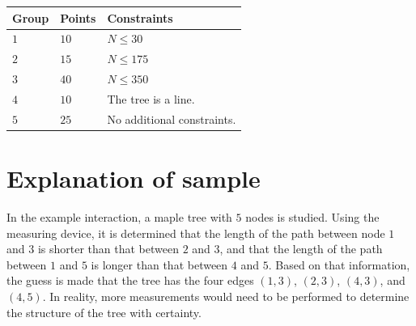 \noindent
\begin{tabular}{| l | l | p{12cm} |}
  \hline
  \textbf{Group} & \textbf{Points} & \textbf{Constraints} \\ \hline
  $1$   & $10$       & $N \le 30$\\ \hline
  $2$   & $15$       & $N \le 175$  \\ \hline
  $3$   & $40$       & $N \le 350$ \\ \hline
  $4$   & $10$       & The tree is a line. \\ \hline
  $5$   & $25$       & No additional constraints. \\ \hline
\end{tabular}


\section*{Explanation of sample}
In the example interaction, a maple tree with $5$ nodes is studied.
Using the measuring device, it is determined that the length of the path between node $1$ and $3$ is shorter
than that between $2$ and $3$, and that the length of the path between $1$ and $5$ is longer than that between $4$ and $5$.
Based on that information, the guess is made that the tree has the four edges $(1, 3)$, $(2, 3)$, $(4, 3)$, and $(4, 5)$.
In reality, more measurements would need to be performed to determine the structure of the tree with certainty.

